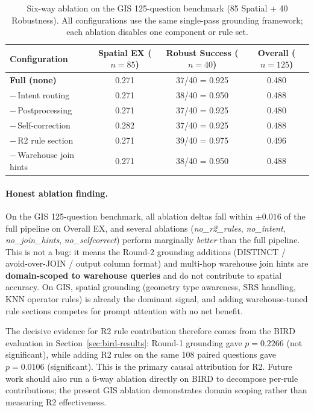 \documentclass[11pt]{article}
\begin{document}
\begin{table}[t]
\centering
\caption{Six-way ablation on the GIS 125-question benchmark (85 Spatial + 40 Robustness). All configurations use the same single-pass grounding framework; each ablation disables one component or rule set.}
\label{tab:ablation}
\begin{tabular}{lccc}
\toprule
Configuration & Spatial EX ($n{=}85$) & Robust Success ($n{=}40$) & Overall ($n{=}125$) \\
\midrule
\textbf{Full (none)}      & 0.271 & 37/40 = 0.925 & 0.480 \\
$-$\,Intent routing       & 0.271 & 38/40 = 0.950 & 0.488 \\
$-$\,Postprocessing       & 0.271 & 37/40 = 0.925 & 0.480 \\
$-$\,Self-correction      & 0.282 & 37/40 = 0.925 & 0.488 \\
$-$\,R2 rule section      & 0.271 & 39/40 = 0.975 & 0.496 \\
$-$\,Warehouse join hints & 0.271 & 38/40 = 0.950 & 0.488 \\
\bottomrule
\end{tabular}
\end{table}

\paragraph{Honest ablation finding.} On the GIS 125-question benchmark, all ablation deltas fall within $\pm 0.016$ of the full pipeline on Overall EX, and several ablations (\textit{no\_r2\_rules}, \textit{no\_intent}, \textit{no\_join\_hints}, \textit{no\_selfcorrect}) perform marginally \emph{better} than the full pipeline. This is not a bug: it means the Round-2 grounding additions (DISTINCT / avoid-over-JOIN / output column format) and multi-hop warehouse join hints are \textbf{domain-scoped to warehouse queries} and do not contribute to spatial accuracy. On GIS, spatial grounding (geometry type awareness, SRS handling, KNN operator rules) is already the dominant signal, and adding warehouse-tuned rule sections competes for prompt attention with no net benefit.

The decisive evidence for R2 rule contribution therefore comes from the BIRD evaluation in Section~\ref{sec:bird-results}: Round-1 grounding gave $p=0.2266$ (not significant), while adding R2 rules on the same 108 paired questions gave $p=0.0106$ (significant). This is the primary causal attribution for R2. Future work should also run a 6-way ablation directly on BIRD to decompose per-rule contributions; the present GIS ablation demonstrates domain scoping rather than measuring R2 effectiveness.
\end{document}
